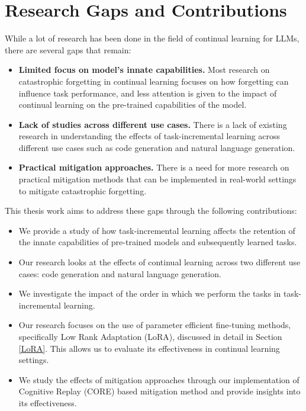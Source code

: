 \section{Research Gaps and Contributions}
While a lot of research has been done in the field of continual learning for LLMs, there are several gaps that remain:
\begin{itemize}
\item \textbf{Limited focus on model's innate capabilities.} Most research on catastrophic forgetting in continual learning focuses on how forgetting can influence task performance, and less attention is given to the impact of continual learning on the pre-trained capabilities of the model.
\item \textbf{Lack of studies across different use cases.} There is a lack of existing research in understanding the effects of task-incremental learning across different use cases such as code generation and natural language generation.
\item \textbf{Practical mitigation approaches.} There is a need for more research on practical mitigation methods that can be implemented in real-world settings to mitigate catastrophic forgetting.
\end{itemize}

This thesis work aims to address these gaps through the following contributions:
\begin{itemize}
\item We provide a study of how task-incremental learning affects the retention of the innate capabilities of pre-trained models and subsequently learned tasks.
\item Our research looks at the effects of continual learning across two different use cases: code generation and natural language generation.
\item We investigate the impact of the order in which we perform the tasks in task-incremental learning.
\item Our research focuses on the use of parameter efficient fine-tuning methods, specifically Low Rank Adaptation (LoRA), discussed in detail in Section \ref{LoRA}. This allows us to evaluate its effectiveness in continual learning settings.
\item We study the effects of mitigation approaches through our implementation of Cognitive Replay (CORE) \cite{zhang2024core} based mitigation method and provide insights into its effectiveness.
\end{itemize}

